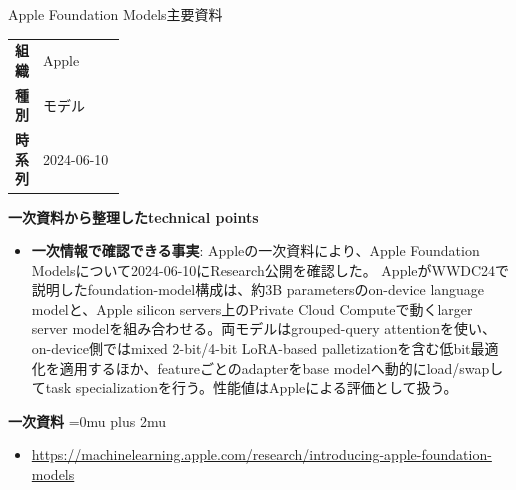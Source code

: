 \begin{technicalnote}{Apple Foundation Models}{主要資料}
\begingroup
\begin{tabularx}{\linewidth}{@{}>{\bfseries}p{0.22\linewidth}X@{}}
組織 & Apple \\
種別 & モデル \\
時系列 & 2024-06-10 \\
\end{tabularx}
\smallskip
\begin{minipage}{\linewidth}
{\bfseries 一次資料から整理したtechnical points}
\begin{itemize}[leftmargin=1.5em,itemsep=0.35em]
\item \textbf{一次情報で確認できる事実}: Appleの一次資料により、Apple Foundation Modelsについて2024-06-10にResearch公開を確認した。 AppleがWWDC24で説明したfoundation-model構成は、約3B parametersのon-device language modelと、Apple silicon servers上のPrivate Cloud Computeで動くlarger server modelを組み合わせる。両モデルはgrouped-query attentionを使い、on-device側ではmixed 2-bit/4-bit LoRA-based palletizationを含む低bit最適化を適用するほか、featureごとのadapterをbase modelへ動的にload/swapしてtask specializationを行う。性能値はAppleによる評価として扱う。
\end{itemize}
\begin{minipage}{\linewidth}
\begin{samepage}
{\bfseries 一次資料}
\begingroup\sloppy
\Urlmuskip=0mu plus 2mu\relax
\begin{itemize}[leftmargin=1.5em,itemsep=0.25em]
\item {\scriptsize\url{https://machinelearning.apple.com/research/introducing-apple-foundation-models}}
\end{itemize}
\endgroup
\end{samepage}
\end{minipage}
\end{minipage}
\endgroup
\end{technicalnote}
\medskip

